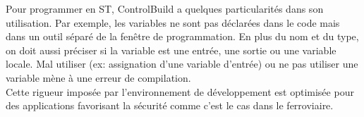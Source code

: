 \documentclass[a4paper]{report}
\begin{document}
	
	Pour programmer en ST, ControlBuild a quelques particularités dans son utilisation. Par exemple, les variables ne sont pas déclarées dans le code mais dans un outil séparé de la fenêtre de programmation. En plus du nom et du type, on doit aussi préciser si la variable est une entrée, une sortie ou une variable locale. Mal utiliser (ex: assignation d'une variable d'entrée) ou ne pas utiliser une variable mène à une erreur de compilation.\\
	Cette rigueur imposée par l'environnement de développement est optimisée pour des applications favorisant la sécurité comme c'est le cas dans le ferroviaire.\\
	
\end{document}
